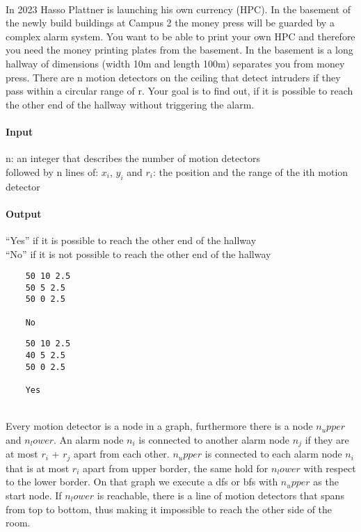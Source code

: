



\makeheader

\\
In 2023 Hasso Plattner is launching his own currency (HPC). In the basement of the newly build buildings at Campus 2 the money press will be guarded by a complex alarm system. 
You want to be able to print your own HPC and therefore you need the money printing plates from the basement. 
In the basement is a long hallway of dimensions (width 10m and length 100m) separates you from money press. There are n motion detectors on the ceiling that detect intruders if they pass within a circular range of r. 
Your goal is to find out, if it is possible to reach the other end of the hallway without triggering the alarm. 

\paragraph*{Input}
n: an integer that describes the number of motion detectors \\
followed by n lines of:
$x_i$, $y_i$ and $r_i$: the position and the range of the ith motion detector


\paragraph*{Output}
“Yes” if it is possible to reach the other end of the hallway \\
“No” if it is not possible to reach the other end of the hallway


\begin{samples}
  \begin{verbatim}
    50 10 2.5
    50 5 2.5
    50 0 2.5 
    
    No   
  \end{verbatim}
    

    
  \begin{verbatim}
    50 10 2.5
    40 5 2.5
    50 0 2.5 
    
    Yes  
  \end{verbatim}
\end{samples}

\\
Every motion detector is a node in a graph, furthermore there is a node $n_upper$ and $n_lower$. 
An alarm node $n_i$ is connected to another alarm node $n_j$ if they are at most $r_i$ + $r_j$ apart from each other. 
$n_upper$ is connected to each alarm node $n_i$ that is at most $r_i$ apart from upper border, the same hold for $n_lower$ with respect to the lower border. 
On that graph we execute a dfs or bfs with $n_upper$ as the start node. If $n_lower$ is reachable, there is a line of motion detectors that spans from top to bottom, thus making it impossible to reach the other side of the room.


